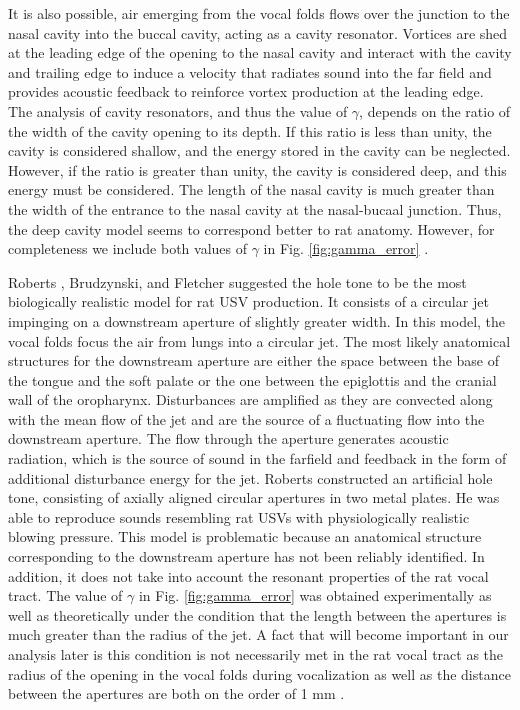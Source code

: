 \documentclass[superscriptaddress, twocolumn, prl]{revtex4}
\begin{document}
It is also possible, air emerging from the vocal folds flows over the junction to the nasal cavity into the buccal cavity, acting as a cavity resonator. Vortices are shed at the leading edge of the opening to the nasal cavity and interact with the cavity and trailing edge to induce a velocity that radiates sound into the far field and provides acoustic feedback to reinforce vortex production at the leading edge. The analysis of cavity resonators, and thus the value of $\gamma$, depends on the ratio of the width of the cavity opening to its depth. If this ratio is less than unity, the cavity is considered shallow, and the energy stored in the cavity can be neglected. However, if the ratio is greater than unity, the cavity is considered deep, and this energy must be considered. The length of the nasal cavity is much greater than the width of the entrance to the nasal cavity at the nasal-bucaal junction. Thus, the deep cavity model seems to correspond better to rat anatomy. However, for completeness we include both values of $\gamma$ in Fig. \ref{fig:gamma_error} \cite{Howe2008, Brudzynski2010}.

Roberts \cite{Roberts1975}, Brudzynski, and Fletcher \cite{Brudzynski2010} suggested the hole tone to be the most biologically realistic model for rat USV production. It consists of a circular jet impinging on a downstream aperture of slightly greater width. In this model, the vocal folds focus the air from lungs into a circular jet. The most likely anatomical structures for the downstream aperture are either the space between the base of the tongue and the soft palate or the one between the epiglottis and the cranial wall of the oropharynx. Disturbances are amplified as they are convected along with the mean flow of the jet and are the source of a fluctuating flow into the downstream aperture. The flow through the aperture generates acoustic radiation, which is the source of sound in the farfield and feedback in the form of additional disturbance energy for the jet. Roberts constructed an artificial hole tone, consisting of axially aligned circular apertures in two metal plates. He was able to reproduce sounds resembling rat USVs with physiologically realistic blowing pressure. This model is problematic because an anatomical structure corresponding to the downstream aperture has not been reliably identified. In addition, it does not take into account the resonant properties of the rat vocal tract. The value of $\gamma$ in Fig. \ref{fig:gamma_error} was obtained experimentally as well as theoretically under the condition that the length between the apertures is much greater than the radius of the jet. A fact that will become important in our analysis later is this condition is not necessarily met in the rat vocal tract as the radius of the opening in the vocal folds during vocalization as well as the distance between the apertures are both on the order of 1 mm \cite{Brudzynski2010,Chanaud1965,Howe2008}.
\end{document}

